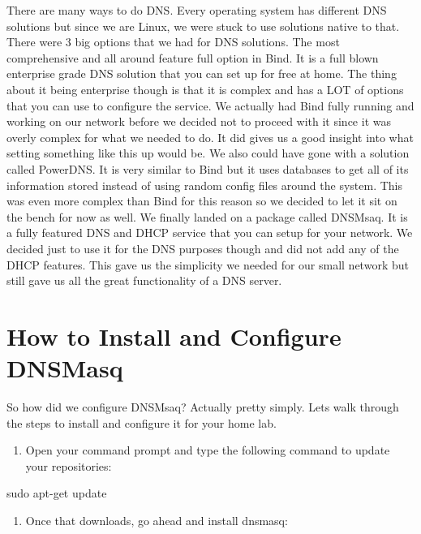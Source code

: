 \documentclass{article} %
\begin{document}
\noindent There are many ways to do DNS. Every operating system has different DNS solutions but since we are Linux, we were stuck to use solutions native to that. There were 3 big options that we had for DNS solutions. The most comprehensive and all around feature full option in Bind. It is a full blown enterprise grade DNS solution that you can set up for free at home. The thing about it being enterprise though is that it is complex and has a LOT of options that you can use to configure the service. We actually had Bind fully running and working on our network before we decided not to proceed with it since it was overly complex for what we needed to do. It did gives us a good insight into what setting something like this up would be. We also could have gone with a solution called PowerDNS. It is very similar to Bind but it uses databases to get all of its information stored instead of using random config files around the system. This was even more complex than Bind for this reason so we decided to let it sit on the bench for now as well. We finally landed on a package called DNSMsaq. It is a fully featured DNS and DHCP service that you can setup for your network. We decided just to use it for the DNS purposes though and did not add any of the DHCP features. This gave us the simplicity we needed for our small network but still gave us all the great functionality of a DNS server.

\noindent 

\noindent 

\noindent 
\section{How to Install and Configure DNSMasq}

\noindent So how did we configure DNSMsaq? Actually pretty simply. Lets walk through the steps to install and configure it for your home lab. 

\begin{enumerate}
\item  Open your command prompt and type the following command to update your repositories:
\end{enumerate}

\noindent 

sudo apt-get update

\noindent 

\noindent 

\begin{enumerate}
\item  Once that downloads, go ahead and install dnsmasq:
\end{enumerate}
\end{document}
